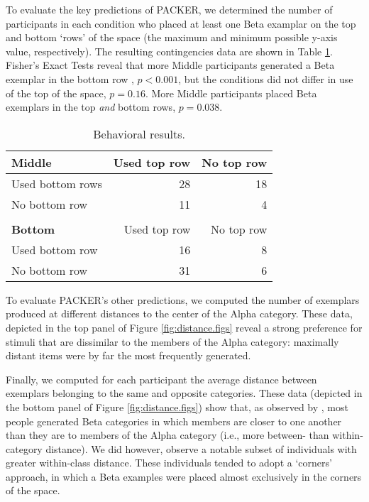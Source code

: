 \documentclass[10pt,letterpaper]{article}
\begin{document}
To evaluate the key predictions of PACKER, we determined the number of participants in each condition who placed at least one Beta examplar on the top and bottom `rows' of the space (the maximum and minimum possible y-axis value, respectively). The resulting contingencies data are shown in Table \ref{table:subset-table}. Fisher's Exact Tests reveal that more Middle participants generated a Beta exemplar in the bottom row , $p < 0.001$, but the conditions did not differ in use of the top of the space, $p = 0.16$. More Middle participants placed Beta exemplars in the top \textit{and} bottom rows, $p = 0.038$. 

\begin{table}
\begin{center} 
\label{table:subset-table} 
\vskip 0.12in
\begin{tabular}{ l r r}
    \textbf{Middle}         & Used top row & No top row \\
    \hline
    Used bottom rows       &  28 & 18  \\
    No bottom row          &  11 &  4  \\
    \\
    \textbf{Bottom}         & Used top row & No top row \\
    \hline
    Used bottom row        & 16 & 8 \\
    No bottom row          & 31 & 6 \\
\end{tabular}
\caption{Behavioral results.} 
\end{center} 
\end{table}
To evaluate PACKER's other predictions, we computed the number of exemplars produced at different distances to the center of the Alpha category. These data, depicted in the top panel of Figure \ref{fig:distance.figs} reveal a strong preference for stimuli that are dissimilar to the members of the Alpha category: maximally distant items were by far the most frequently generated. 

Finally, we computed for each participant the average distance between exemplars belonging to the same and opposite categories. These data (depicted in the bottom panel of Figure \ref{fig:distance.figs}) show that, as observed by \citet{ward1994structured}, most people generated Beta categories in which members are closer to one another than they are to members of the Alpha category (i.e., more between- than within-category distance). We did however, observe a notable subset of individuals with greater within-class distance. These individuals tended to adopt a `corners' approach, in which a Beta examples were placed almost exclusively in the corners of the space.
\end{document}
